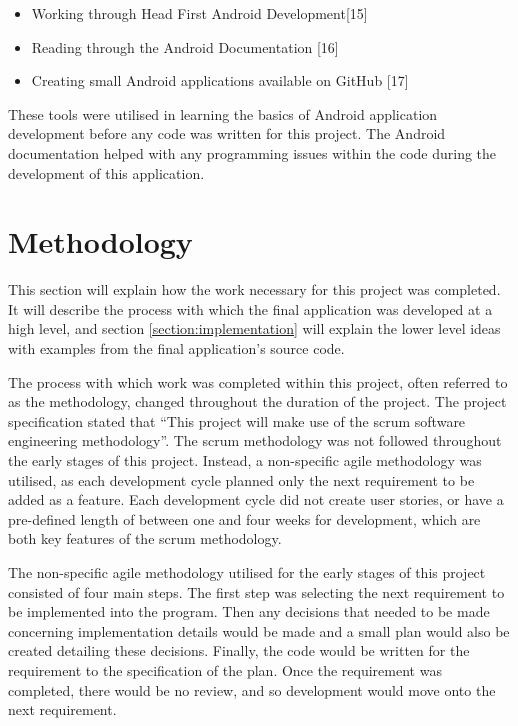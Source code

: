 \documentclass{article}
\begin{document}
\begin{itemize}
	\item Working through Head First Android Development[15]
	\item Reading through the Android Documentation [16]
	\item Creating small Android applications available on GitHub [17]
\end{itemize}

These tools were utilised in learning the basics of Android application development before any code was written for this project. The Android documentation helped with any programming issues within the code during the development of this application. 

\section{Methodology}
\label{section:methodology}

This section will explain how the work necessary for this project was completed. It will describe the process with which the final application was developed at a high level, and section \ref{section:implementation} will explain the lower level ideas with examples from the final application's source code. \par

The process with which work was completed within this project, often referred to as the methodology, changed throughout the duration of the project. The project specification stated that ``This project will make use of the scrum software engineering methodology''. The scrum methodology was not followed throughout the early stages of this project. Instead, a non-specific agile methodology was utilised, as each development cycle planned only the next requirement to be added as a feature. Each development cycle did not create user stories, or have a pre-defined length of between one and four weeks for development, which are both key features of the scrum methodology. \par

The non-specific agile methodology utilised for the early stages of this project consisted of four main steps. The first step was selecting the next requirement to be implemented into the program. Then any decisions that needed to be made concerning implementation details would be made and a small plan would also be created detailing these decisions. Finally, the code would be written for the requirement to the specification of the plan. Once the requirement was completed, there would be no review, and so development would move onto the next requirement. \par
\end{document}
